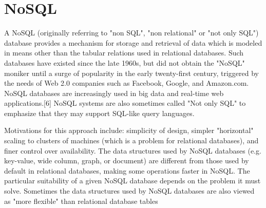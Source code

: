 \section{NoSQL}
A NoSQL (originally referring to "non SQL", "non relational" or "not only
SQL") database provides a mechanism for storage and retrieval of data which
is modeled in means other than the tabular relations used in relational
databases. Such databases have existed since the late 1960s, but did not obtain
the "NoSQL" moniker until a surge of popularity in the early twenty-first
century, triggered by the needs of Web 2.0 companies such as Facebook,
Google, and Amazon.com. NoSQL databases are increasingly used in big
data and real-time web applications.[6] NoSQL systems are also sometimes called
"Not only SQL" to emphasize that they may support SQL-like query
languages.

Motivations for this approach include: simplicity of design, simpler
"horizontal" scaling to clusters of machines (which is a problem for relational
databases), and finer control over availability. The data structures used by
NoSQL databases (e.g. key-value, wide column, graph, or document) are different
from those used by default in relational databases, making some operations
faster in NoSQL. The particular suitability of a given NoSQL database depends on
the problem it must solve. Sometimes the data structures used by NoSQL databases
are also viewed as "more flexible" than relational database tables

